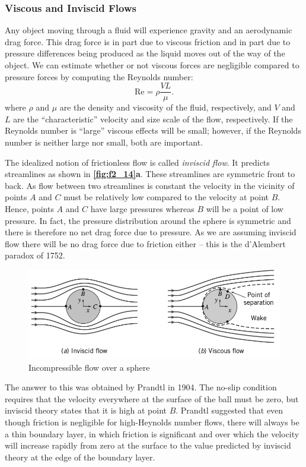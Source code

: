 \subsubsection{Viscous and Inviscid Flows}
Any object moving through a fluid will experience gravity and an aerodynamic drag force. This drag force is in part due to viscous friction and in part due to pressure differences being produced as the liquid moves out of the way of the object. We can estimate whether or not viscous forces are negligible compared to pressure forces by computing the Reynolds number:
\[ 
\mathrm{Re} = \rho \frac{VL}{\mu}
.\]
where $\rho$ and $\mu$ are the density and viscosity of the fluid, respectively, and $V$ and $L$ are the ``characteristic'' velocity and size scale of the flow, respectively. If the Reynolds number is ``large'' viscous effects will be small; however, if the Reynolds number is neither large nor small, both are important. 

The idealized notion of frictionless flow is called \textit{inviscid flow}. It predicts streamlines as shown in \textbf{\autoref{fig:f2_14}a}. These streamlines are symmetric front to back. As flow between two streamlines is constant the velocity in the vicinity of points $A$ and $C$ must be relatively low compared to the velocity at point $B$. Hence, points $A$ and $C$ have large pressures whereas $B$ will be a point of low pressure. In fact, the pressure distribution around the sphere is symmetric and there is therefore no net drag force due to pressure. As we are assuming inviscid flow there will be no drag force due to friction either -- this is the d'Alembert paradox of 1752.

\begin{figure} [ht]
  \centering
  \includegraphics[width=0.5\linewidth]{./figures/f2_14.png}
  \caption{Incompressible flow over a sphere}
  \label{fig:f2_14}
\end{figure}

The answer to this was obtained by Prandtl in 1904. The no-slip condition requires that the velocity everywhere at the surface of the ball must be zero, but inviscid theory states that it is high at point $B$. Prandtl suggested that even though friction is negligible for high-Heynolds number flows, there will always be a thin boundary layer, in which friction is significant and over which the velocity will increase rapidly from zero at the surface to the value predicted by inviscid theory at the edge of the boundary layer. 

